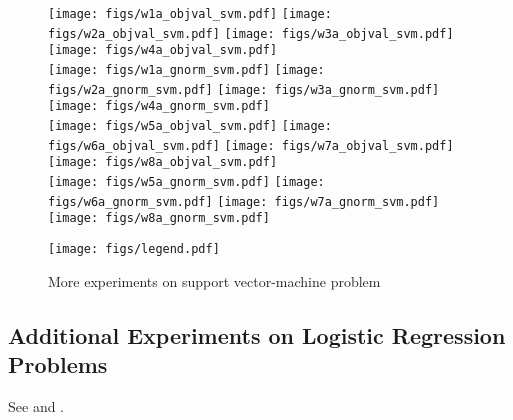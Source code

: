 \begin{figure}

\centering
\texttt{[image: figs/w1a\_objval\_svm.pdf]}
\texttt{[image: figs/w2a\_objval\_svm.pdf]}
\texttt{[image: figs/w3a\_objval\_svm.pdf]}
\texttt{[image: figs/w4a\_objval\_svm.pdf]}
\\
\texttt{[image: figs/w1a\_gnorm\_svm.pdf]}
\texttt{[image: figs/w2a\_gnorm\_svm.pdf]}
\texttt{[image: figs/w3a\_gnorm\_svm.pdf]}
\texttt{[image: figs/w4a\_gnorm\_svm.pdf]}
\\
\texttt{[image: figs/w5a\_objval\_svm.pdf]}
\texttt{[image: figs/w6a\_objval\_svm.pdf]}
\texttt{[image: figs/w7a\_objval\_svm.pdf]}
\texttt{[image: figs/w8a\_objval\_svm.pdf]}
\\
\texttt{[image: figs/w5a\_gnorm\_svm.pdf]}
\texttt{[image: figs/w6a\_gnorm\_svm.pdf]}
\texttt{[image: figs/w7a\_gnorm\_svm.pdf]}
\texttt{[image: figs/w8a\_gnorm\_svm.pdf]}
	
\texttt{[image: figs/legend.pdf]}
\caption{More experiments on support vector-machine problem}
\label{fig:svm-add-2}
\end{figure}

\subsection{Additional Experiments on Logistic Regression Problems}
See  and .


